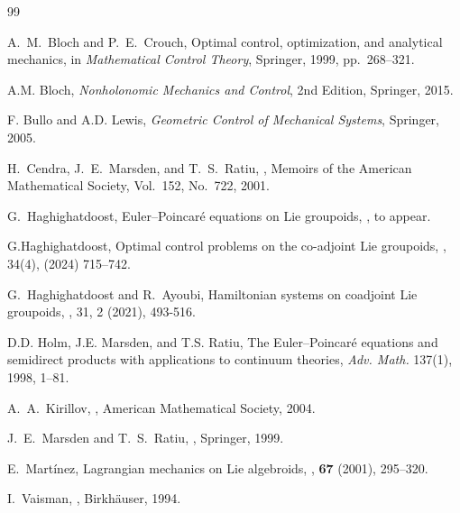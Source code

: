 \documentclass{article}
\begin{document}
\begin{thebibliography}{99}


A.~M.~Bloch and P.~E.~Crouch,
\newblock Optimal control, optimization, and analytical mechanics,
\newblock in {\em Mathematical Control Theory},
Springer, 1999, pp.~268--321.

 A.M. Bloch, \emph{Nonholonomic Mechanics and Control}, 2nd Edition, Springer, 2015.

 F. Bullo and A.D. Lewis, \emph{Geometric Control of Mechanical Systems}, Springer, 2005.

H.~Cendra, J.~E.~Marsden, and T.~S.~Ratiu,
,
\newblock Memoirs of the American Mathematical Society, Vol.~152, No.~722, 2001.

G.~Haghighatdoost,
\newblock Euler--Poincar\'e equations on Lie groupoids, \newblock {\em}, to appear.

 G.Haghighatdoost,  Optimal control problems on the co-adjoint Lie groupoids, , 34(4), (2024) 715–742.


G.~Haghighatdoost and R.~Ayoubi,
\newblock Hamiltonian systems on coadjoint Lie groupoids, , 31, 2 (2021), 493-516.

 D.D. Holm, J.E. Marsden, and T.S. Ratiu, The Euler--Poincar\'e equations and semidirect products with applications to continuum theories, \emph{Adv. Math.} 137(1), 1998, 1--81.

A.~A.~Kirillov,
,
\newblock American Mathematical Society, 2004.

J.~E.~Marsden and T.~S.~Ratiu,
,
\newblock Springer, 1999.

E.~Mart{\'i}nez,
\newblock Lagrangian mechanics on Lie algebroids,
, \textbf{67} (2001), 295--320.

I.~Vaisman,
,
\newblock Birkh{\"a}user, 1994.


\end{thebibliography}
\end{document}
